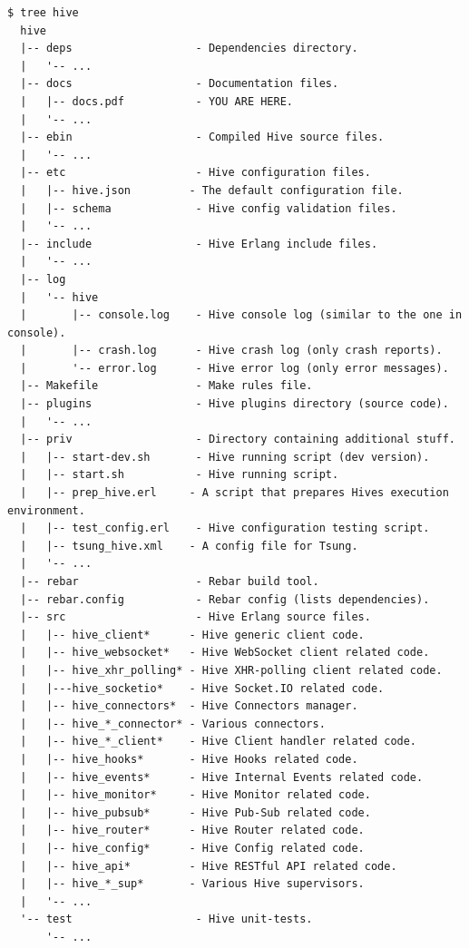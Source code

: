 \documentclass[a4paper]{article}
\begin{document}
\begin{verbatim}
$ tree hive
  hive
  |-- deps                   - Dependencies directory.
  |   '-- ...
  |-- docs                   - Documentation files.
  |   |-- docs.pdf           - YOU ARE HERE.
  |   '-- ...
  |-- ebin                   - Compiled Hive source files.
  |   '-- ...
  |-- etc                    - Hive configuration files.
  |   |-- hive.json         - The default configuration file.
  |   |-- schema             - Hive config validation files.
  |   '-- ...
  |-- include                - Hive Erlang include files.
  |   '-- ...
  |-- log
  |   '-- hive
  |       |-- console.log    - Hive console log (similar to the one in console).
  |       |-- crash.log      - Hive crash log (only crash reports).
  |       '-- error.log      - Hive error log (only error messages).
  |-- Makefile               - Make rules file.
  |-- plugins                - Hive plugins directory (source code).
  |   '-- ...
  |-- priv                   - Directory containing additional stuff.
  |   |-- start-dev.sh       - Hive running script (dev version).
  |   |-- start.sh           - Hive running script.
  |   |-- prep_hive.erl     - A script that prepares Hives execution environment.
  |   |-- test_config.erl    - Hive configuration testing script.
  |   |-- tsung_hive.xml    - A config file for Tsung.
  |   '-- ...
  |-- rebar                  - Rebar build tool.
  |-- rebar.config           - Rebar config (lists dependencies).
  |-- src                    - Hive Erlang source files.
  |   |-- hive_client*      - Hive generic client code.
  |   |-- hive_websocket*   - Hive WebSocket client related code.
  |   |-- hive_xhr_polling* - Hive XHR-polling client related code.
  |   |---hive_socketio*    - Hive Socket.IO related code.
  |   |-- hive_connectors*  - Hive Connectors manager.
  |   |-- hive_*_connector* - Various connectors.
  |   |-- hive_*_client*    - Hive Client handler related code.
  |   |-- hive_hooks*       - Hive Hooks related code.
  |   |-- hive_events*      - Hive Internal Events related code.
  |   |-- hive_monitor*     - Hive Monitor related code.
  |   |-- hive_pubsub*      - Hive Pub-Sub related code.
  |   |-- hive_router*      - Hive Router related code.
  |   |-- hive_config*      - Hive Config related code.
  |   |-- hive_api*         - Hive RESTful API related code.
  |   |-- hive_*_sup*       - Various Hive supervisors.
  |   '-- ...
  '-- test                   - Hive unit-tests.
      '-- ...
\end{verbatim}
\end{document}
